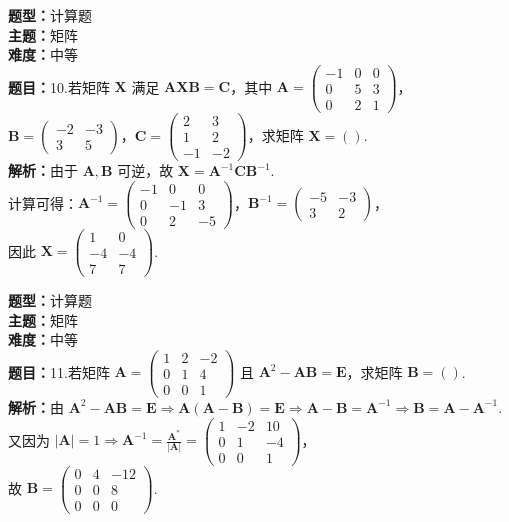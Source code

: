 \documentclass{ctexart}
\newenvironment{question}[5]{%
	\noindent\textbf{题型：}#1\\
	\textbf{主题：}#2\\
	\textbf{难度：}#3\\
	\textbf{题目：}#4\\
	\textbf{解析：}#5\\
	\vspace{1em}
}{}
\begin{document}
	\begin{question}
		{计算题}
		{矩阵}
		{中等}
		{10.若矩阵 \(\mathbf{X}\) 满足 \(\mathbf{A} \mathbf{X} \mathbf{B} = \mathbf{C}\)，其中 \(\mathbf{A} = \left(\begin{array}{ccc}-1 & 0 & 0 \\ 0 & 5 & 3 \\ 0 & 2 & 1\end{array}\right)\)，\(\mathbf{B} = \left(\begin{array}{cc}-2 & -3 \\ 3 & 5\end{array}\right)\)，\(\mathbf{C} = \left(\begin{array}{cc}2 & 3 \\ 1 & 2 \\ -1 & -2\end{array}\right)\)，求矩阵 \(\mathbf{X} = ()\). }
		{由于 \(\mathbf{A}, \mathbf{B}\) 可逆，故 \(\mathbf{X} = \mathbf{A}^{-1} \mathbf{C} \mathbf{B}^{-1}\). \\
			计算可得：\(\mathbf{A}^{-1} = \left(\begin{array}{ccc}-1 & 0 & 0 \\ 0 & -1 & 3 \\ 0 & 2 & -5\end{array}\right)\)，\(\mathbf{B}^{-1} = \left(\begin{array}{cc}-5 & -3 \\ 3 & 2\end{array}\right)\)，\\
			因此 \(\mathbf{X} = \left(\begin{array}{cc}1 & 0 \\ -4 & -4 \\ 7 & 7\end{array}\right)\). }
	\end{question}
	
	\begin{question}
		{计算题}
		{矩阵}
		{中等}
		{11.若矩阵 \(\mathbf{A} = \left(\begin{array}{ccc}1 & 2 & -2 \\ 0 & 1 & 4 \\ 0 & 0 & 1\end{array}\right)\) 且 \(\mathbf{A}^2 - \mathbf{A}\mathbf{B} = \mathbf{E}\)，求矩阵 \(\mathbf{B} = ()\). }
		{由 \(\mathbf{A}^2 - \mathbf{A}\mathbf{B} = \mathbf{E} \Rightarrow \mathbf{A}(\mathbf{A} - \mathbf{B}) = \mathbf{E} \Rightarrow \mathbf{A} - \mathbf{B} = \mathbf{A}^{-1} \Rightarrow \mathbf{B} = \mathbf{A} - \mathbf{A}^{-1}\). \\
			又因为 \(|\mathbf{A}| = 1 \Rightarrow \mathbf{A}^{-1} = \frac{\mathbf{A}^*}{|\mathbf{A}|} = \left(\begin{array}{ccc}1 & -2 & 10 \\ 0 & 1 & -4 \\ 0 & 0 & 1\end{array}\right)\)，\\
			故 \(\mathbf{B} = \left(\begin{array}{ccc}0 & 4 & -12 \\ 0 & 0 & 8 \\ 0 & 0 & 0\end{array}\right)\). }
	\end{question}
	
\end{document}
